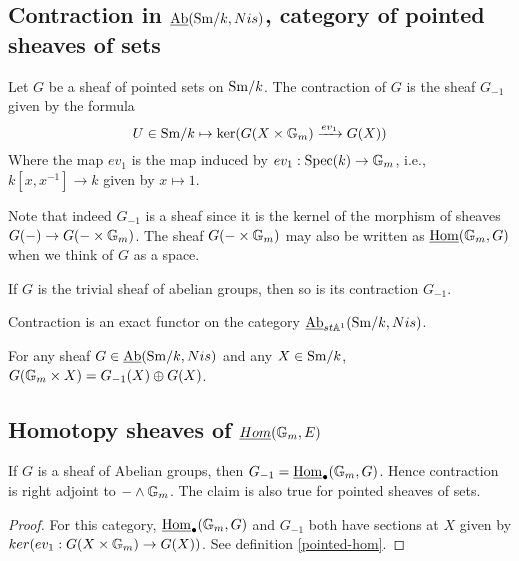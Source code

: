 \documentclass{amsart}%
\begin{document}
\subsection{Contraction in $\operatorname{\underline{Ab}}(\mathrm{Sm}/k,Nis)$, category of pointed
  sheaves of sets}

\begin{definition}
  Let $G$ be a sheaf of pointed sets on $\mathrm{Sm}/k$. The contraction of
  $G$ is the sheaf $G_{-1}$ given by the formula
  \begin{equation*}
    U \in \mathrm{Sm}/k \mapsto \ker( G(X\times \mathbb{G}_m) \xrightarrow{ev_1} G(X))
  \end{equation*}
  Where the map $ev_1$ is the map induced by
  $ev_1 : \operatorname{Spec}(k) \to \mathbb{G}_m$, i.e., $k[x,x^{-1}] \to k$ given by
  $x\mapsto 1$.

  Note that indeed $G_{-1}$ is a sheaf since it is the kernel of the
  morphism of sheaves $G(-) \to G(-\times \mathbb{G}_m)$. The sheaf
  $G(-\times \mathbb{G}_m)$ may also be written as
  $\underline{\operatorname{Hom}}(\mathbb{G}_m, G)$ when we think of $G$ as a
  space.
\end{definition}

\begin{proposition}
  If $G$ is the trivial sheaf of abelian groups, then so is its
  contraction $G_{-1}$.
\end{proposition}

\begin{proposition}
  Contraction is an exact functor on the category
  $\operatorname{\underline{Ab}}_{st\mathbb{A}^1}(\mathrm{Sm}/k,Nis)$.

  For any sheaf $G \in \operatorname{\underline{Ab}}(\mathrm{Sm}/k,Nis)$ and any $X \in \mathrm{Sm}/k$,
  $G(\mathbb{G}_m\times X) = G_{-1}(X) \oplus G(X)$.
\end{proposition}


\subsection{Homotopy sheaves of $\underline{Hom}(\mathbb{G}_m, E)$}

\begin{proposition}
  If $G$ is a sheaf of Abelian groups, then
  $G_{-1} = \underline{\operatorname{Hom}}_{\bullet}(\mathbb{G}_m, G)$.  Hence contraction
  is right adjoint to $- \wedge \mathbb{G}_m$. The claim is also true for
  pointed sheaves of sets.
\end{proposition}

\begin{proof}
  For this category, $\underline{\operatorname{Hom}}_{\bullet}(\mathbb{G}_m, G)$ and
  $G_{-1}$ both have sections at $X$ given by
  $ker( ev_1 : G(X \times \mathbb{G}_m) \to G(X))$. See definition
  \ref{pointed-hom}.
\end{proof}
\end{document}
